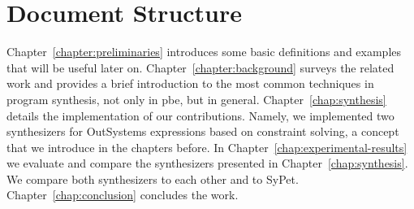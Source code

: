 \section{Document Structure}
\label{sec:structure}

Chapter~\ref{chapter:preliminaries} introduces some basic definitions and examples
that will be useful later on.
Chapter~\ref{chapter:background} surveys the related work and provides a brief
introduction to the most common techniques in program synthesis, not only in
\gls{pbe}, but in general.
Chapter~\ref{chap:synthesis} details the implementation of our contributions.
Namely, we implemented two synthesizers for OutSystems expressions based on
constraint solving, a concept that we introduce in the chapters before.
In Chapter~\ref{chap:experimental-results} we evaluate and compare the
synthesizers presented in Chapter~\ref{chap:synthesis}.
We compare both synthesizers to each other and to SyPet.
Chapter~\ref{chap:conclusion} concludes the work.